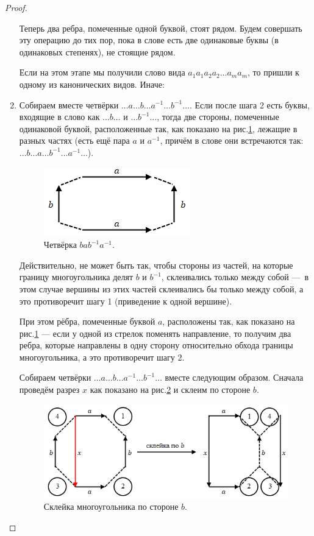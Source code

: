 \begin{proof}
\begin{enumerate}
        Теперь два ребра, помеченные одной буквой, стоят рядом. Будем совершать эту операцию до тих пор, пока в слове есть две одинаковые буквы (в одинаковых степенях), не стоящие рядом.

        Если на этом этапе мы получили слово вида $a_1 a_1 a_2 a_2 \dots a_m a_m$, то пришли к одному из канонических видов. Иначе:

        \item Собираем вместе четвёрки $\dots a \dots b \dots a^{-1} \dots b^{-1} \dots$.
        Если после шага 2 есть буквы, входящие в слово как $\dots b \dots$ и $\dots b^{-1} \dots$, тогда две стороны, помеченные одинаковой буквой, расположенные так, как показано на рис.\ref{fig:c10.7}, лежащие в разных частях (есть ещё пара $a$ и $a^{-1}$, причём в слове они встречаются так: $\dots b \dots a \dots b^{-1} \dots a^{-1} \dots$).

        \begin{figure}[htbp]
            \centering
            \includegraphics[scale=0.7]{images/c10.7.png}
            \caption{Четвёрка $b a b^{-1} a^{-1}$.}
            \label{fig:c10.7}
        \end{figure}

        Действительно, не может быть так, чтобы стороны из частей, на которые границу многоугольника делят $b$ и $b^{-1}$, склеивались только между собой — в этом случае вершины из этих частей склеивались бы только между собой, а это противоречит шагу 1 (приведение к одной вершине).

        При этом рёбра, помеченные буквой $a$, расположены так, как показано на рис.\ref{fig:c10.7} — если у одной из стрелок поменять направление, то получим два ребра, которые направлены в одну сторону относительно обхода границы многоугольника, а это противоречит шагу 2.

        Собираем четвёрки $\dots a \dots b \dots a^{-1} \dots b^{-1} \dots$ вместе следующим образом. Сначала проведём разрез $x$ как показано на рис.\ref{fig:c10.8} и склеим по стороне $b$.

        \begin{figure}[htbp]
            \centering
            \includegraphics[scale=0.7]{images/c10.8.png}
            \caption{Склейка многоугольника по стороне $b$.}
            \label{fig:c10.8}
        \end{figure}


\end{enumerate}
\end{proof}
